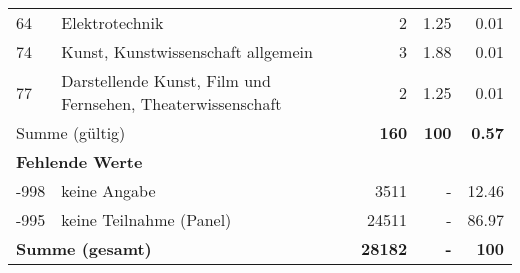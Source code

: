 \begin{longtable}{lXrrr}
        64 & \multicolumn{1}{X}{Elektrotechnik} & %
          \num{2} &
          \num[round-mode=places,round-precision=2]{1,25} &
          \num[round-mode=places,round-precision=2]{0,01} \\

        74 & \multicolumn{1}{X}{Kunst, Kunstwissenschaft allgemein} & %
          \num{3} &
          \num[round-mode=places,round-precision=2]{1,88} &
          \num[round-mode=places,round-precision=2]{0,01} \\

        77 & \multicolumn{1}{X}{Darstellende Kunst, Film und Fernsehen, Theaterwissenschaft} & %
          \num{2} &
          \num[round-mode=places,round-precision=2]{1,25} &
          \num[round-mode=places,round-precision=2]{0,01} \\

     \midrule
     \multicolumn{2}{l}{Summe (gültig)} &
       \textbf{\num{160}} &
     \textbf{100} &
       \textbf{\num[round-mode=places,round-precision=2]{0,57}} \\
     \multicolumn{5}{l}{\textbf{Fehlende Werte}}\\
       -998 &
       keine Angabe &
         \num{3511} &
        - &
         \num[round-mode=places,round-precision=2]{12,46} \\
       -995 &
       keine Teilnahme (Panel) &
         \num{24511} &
        - &
         \num[round-mode=places,round-precision=2]{86,97} \\
     \midrule
     \multicolumn{2}{l}{\textbf{Summe (gesamt)}} &
          \textbf{\num{28182}} &
        \textbf{-} &
        \textbf{100} \\
     \bottomrule
     \end{longtable}
     
